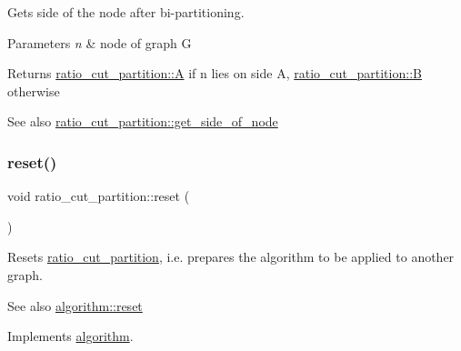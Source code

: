 Gets side of the node after bi-\/partitioning.


\begin{DoxyParams}{Parameters}
{\em n} & node of graph G \\
\hline
\end{DoxyParams}
\begin{DoxyReturn}{Returns}
{\ttfamily \mbox{\hyperlink{classratio__cut__partition_ae1a3cd1c2ede82023f9a229e40909139}{ratio\+\_\+cut\+\_\+partition\+::A}}} if {\ttfamily n} lies on side {\ttfamily A}, {\ttfamily \mbox{\hyperlink{classratio__cut__partition_adf075987228d8adc7950d5b1ba332daa}{ratio\+\_\+cut\+\_\+partition\+::B}}} otherwise 
\end{DoxyReturn}
\begin{DoxySeeAlso}{See also}
\mbox{\hyperlink{classratio__cut__partition_a3b0a7dcc26c9ca25016abf2cebf250fe}{ratio\+\_\+cut\+\_\+partition\+::get\+\_\+side\+\_\+of\+\_\+node}} 
\end{DoxySeeAlso}
\mbox{\label{classratio__cut__partition_ad017eaf98f9ae4ca9dbe6b3eda9fc94d}} 
\subsubsection{\texorpdfstring{reset()}{reset()}}
{\footnotesize\ttfamily void ratio\+\_\+cut\+\_\+partition\+::reset (\begin{DoxyParamCaption}{ }\end{DoxyParamCaption})\hspace{0.3cm}{\ttfamily [virtual]}}

Resets \mbox{\hyperlink{classratio__cut__partition}{ratio\+\_\+cut\+\_\+partition}}, i.\+e. prepares the algorithm to be applied to another graph.

\begin{DoxySeeAlso}{See also}
\mbox{\hyperlink{classalgorithm_a21aba63d066ae7897de6ca7d8425c408}{algorithm\+::reset}} 
\end{DoxySeeAlso}


Implements \mbox{\hyperlink{classalgorithm_a21aba63d066ae7897de6ca7d8425c408}{algorithm}}.

\mbox{\label{classratio__cut__partition_a4ab180ca4cf57c811e3478c3de4c4dc3}} 
